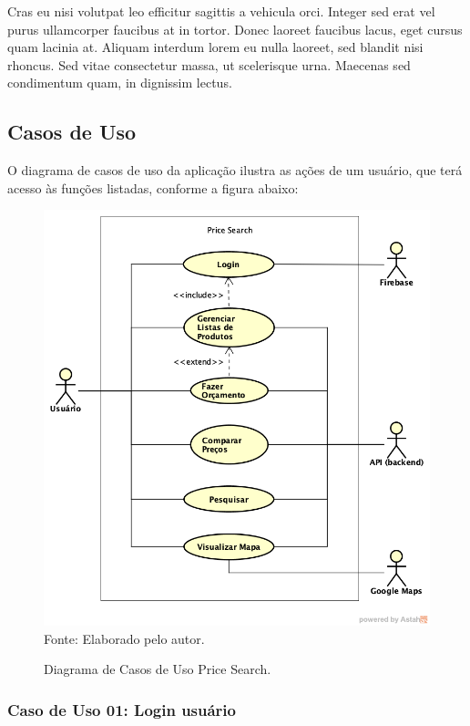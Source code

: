  Cras eu nisi volutpat leo efficitur sagittis a vehicula orci. Integer sed erat vel purus ullamcorper faucibus at in tortor. Donec laoreet faucibus lacus, eget cursus quam lacinia at. Aliquam interdum lorem eu nulla laoreet, sed blandit nisi rhoncus. Sed vitae consectetur massa, ut scelerisque urna. Maecenas sed condimentum quam, in dignissim lectus. 
 
 \subsection{Casos de Uso}
O diagrama de casos de uso da aplicação ilustra as ações de um usuário, que terá acesso às funções listadas, conforme a figura abaixo:

\begin{figure}[!htb]
\centering
\caption{Diagrama de Casos de Uso Price Search.}
\includegraphics[width=\linewidth]{figuras/DiagramaCasosUsoPriceSearch.png}
{\footnotesize Fonte: Elaborado pelo autor.}
\end{figure}

\subsubsection{Caso de Uso 01: Login usuário}

